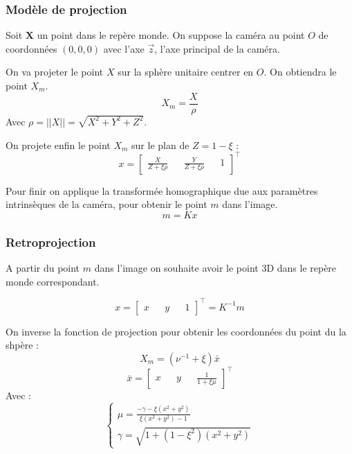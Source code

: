\subsubsection{Modèle de projection}

Soit $\mathbf{X}$ un point dans le repère monde.
On suppose la caméra au point $O$ de coordonnées $(0,0,0)$ avec l'axe $\vec{z}$, l'axe principal de la caméra.

On va projeter le point $X$ sur la sphère unitaire centrer en $O$. On obtiendra le point $X_m$.
\begin{equation}
X_m = \frac{X}{\rho}
\end{equation}
Avec $\rho = ||X|| = \sqrt{X^2+Y^2+Z^2}$.

On projete enfin le point $X_m$ sur le plan de $Z = 1 - \xi$ :
\begin{equation}
x = \begin{bmatrix}  \frac{X}{Z+\xi \rho} && \frac{Y}{Z +\xi \rho} && 1 \end{bmatrix}^{\top}
\end{equation}

Pour finir on applique la transformée homographique due aux paramètres intrinsèques de la caméra, pour obtenir le point $m$ dans l'image.
\begin{equation}
m= K x
\end{equation}

\subsubsection{Retroprojection}

A partir du point $m$ dans l'image on souhaite avoir le point 3D dans le repère monde correspondant.

\begin{equation}
x = \begin{bmatrix} x && y && 1 \end{bmatrix}^{\top} = K^{-1} m
\end{equation}

On inverse la fonction de projection pour obtenir les coordonnées du point du la shpère :
\begin{equation}
X_m = (\nu^{-1} + \xi) \bar{x}
\end{equation}
\begin{equation}
\bar{x} = \begin{bmatrix}x && y && \frac{1}{1+\xi \mu} \end{bmatrix}^{\top}
\end{equation}
Avec :
\begin{equation}
  \left \{
  \begin{matrix}
    \mu = \frac{-\gamma-\xi(x^2+y^2)}{\xi(x^2+y^2)-1} \\
    \gamma = \sqrt{1+(1-\xi^2)(x^2+y^2)}
  \end{matrix}
 \right.
\end{equation}

